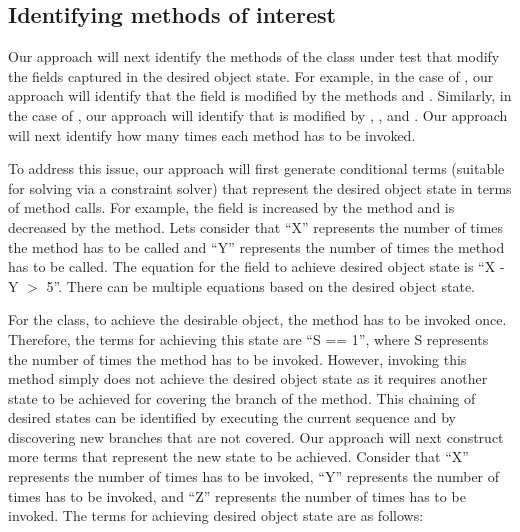 \subsection{Identifying methods of interest}

Our approach will next identify the methods of the class under test that modify the fields captured in the desired object state. For example, in the case of , our approach will identify that the  field is modified by the methods  and . Similarly, in the case of , our approach will identify that  is modified by , , and . Our approach will next identify how many times each method has to be invoked. 

To address this issue, our approach will first generate conditional terms (suitable for solving via a constraint solver) that represent the desired object state in terms of method calls. For example, the field  is increased by the  method and is decreased by the  method. Lets consider that ``X'' represents the number of times the  method has to be called and ``Y'' represents the number of times the  method has to be called. The equation for the  field to achieve desired object state is ``X - Y $>$ 5''. There can be multiple equations based on the desired object state.

For the  class, to achieve the desirable object, the method  has to be invoked once. Therefore, the terms for achieving this state are ``S == 1'', where S represents the number of times the method  has to be invoked. However, invoking this method simply does not achieve the desired object state as it requires another state to be achieved for covering the  branch of the  method. This chaining of desired states  can be identified by executing the current sequence and by discovering new branches that are not covered. Our approach will next construct more terms that represent the new state to be achieved. Consider that ``X'' represents the number of times  has to be invoked, ``Y'' represents the number of times  has to be invoked, and ``Z'' represents the number of times  has to be invoked. The terms for achieving desired object state are as follows:

